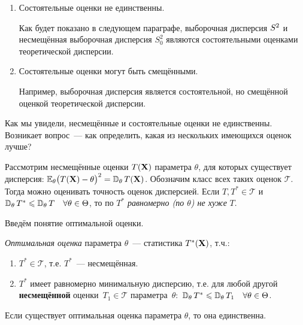 \begin{rmrk}
\begin{enumerate}
    \item Состоятельные оценки не единственны.
    
    Как будет показано в следующем параграфе, выборочная дисперсия $S^{2}$ и несмещённая выборочная дисперсия $S_0^{2}$ являются состоятельными оценками теоретической дисперсии.
    
    \item Состоятельные оценки могут быть смещёнными.
    
    Например, выборочная дисперсия является состоятельной, но смещённой оценкой теоретической дисперсии.
    
    \end{enumerate}
\end{rmrk}

Как мы увидели, несмещённые и состоятельные оценки не единственны.
Возникает вопрос~--- как определить, какая из нескольких имеющихся оценок лучше?

Рассмотрим несмещённые оценки $T(\mathbf{X})$ параметра $\theta$, для которых существует дисперсия: $\operatorname{\operatorname{\mathbb{E}}_{\theta}} \bigl(T(\mathbf{X})-\theta\bigr)^{2}=\operatorname{\mathbb{D}_{\theta}} T(\mathbf{X})$.
Обозначим класс всех таких оценок $\mathcal{T}$.
Тогда можно оценивать точность оценок дисперсией.
Если $T, T^* \in \mathcal{T}$ и $\operatorname{\mathbb{D}_{\theta}} T^* \leqslant \operatorname{\mathbb{D}_{\theta}} T \quad \forall \theta \in \Theta$, то по $T^*$ \textit{равномерно (по $\theta$) не хуже} $T$.

Введём понятие оптимальной оценки.
\begin{defn}
    \textit{Оптимальная оценка} параметра $\theta$~--- статистика $T^*(\mathbf{X})$, т.ч.:
    \begin{enumerate}
        \item $T^* \in \mathcal{T}$, т.е. $T^*$~--- несмещённая.
        \item $T^*$ имеет равномерно минимальную дисперсию, т.е. для любой другой \textbf{несмещённой} оценки~$T_{1} \in \mathcal{T}$ параметра~$\theta \colon$ ${\operatorname{\mathbb{D}_{\theta}} T^* \leqslant \operatorname{\mathbb{D}_{\theta}} T_{1}} \quad {\forall \theta \in \Theta}$.
    \end{enumerate}
\end{defn}

\vspace{5mm}
\begin{thm*}
    Если существует оптимальная оценка параметра $\theta$, то она единственна.
\end{thm*}

